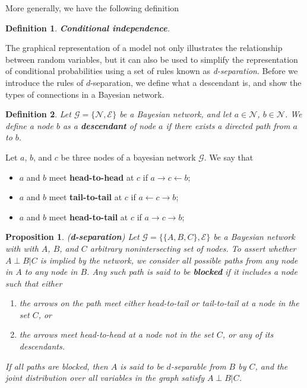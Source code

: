 \documentclass[12pt, oneside]{book}
\numberwithin{equation}{section}
\newtheorem{definition}{Definition}[section]
\newtheorem{proposition}{Proposition}[section]
\begin{document}
{More generally, we have the following definition
\begin{definition}
	\textbf{Conditional independence}.
\end{definition}

The graphical representation of a model not only illustrates the relationship between random variables, but it can also be used to simplify the representation of conditional probabilities using a set of rules known as \textit{d-separation}. Before we introduce the rules of $d$-separation, we define what a descendant is, and show the types of connections in a Bayesian network.

\begin{definition}
	Let $\mathcal G = \{\mathscr{N}, \mathscr{E}\}$ be a Bayesian network, and let $a \in \mathscr{N}$, $b \in \mathscr{N}$. We define a node $b$ as a \textbf{descendant} of node $a$ if there exists a directed path from $a$ to $b$.
\end{definition}

Let $a$, $b$, and $c$ be three nodes of a bayesian network $\mathcal G$. We say that
\begin{itemize}
	\item $a$ and $b$ meet \textbf{head-to-head} at $c$ if $a \rightarrow c \leftarrow b $;
	\item $a$ and $b$ meet \textbf{tail-to-tail} at $c$ if $a \leftarrow c \rightarrow b $;
	\item $a$ and $b$ meet \textbf{head-to-tail} at $c$ if $a \rightarrow c \rightarrow b $;
\end{itemize}

\begin{proposition}
	(\textbf{d-separation}) Let $\mathcal G = \{\{A, B, C\}, \mathscr{E}\}$ be a Bayesian network with with $A$, $B$, and $C$ arbitrary nonintersecting set of nodes. To assert whether $A \perp B \vert C$ is implied by the network, we consider all possible paths from any node in $A$ to any node in $B$. Any such path is said to be \textbf{blocked} if it includes a node such that either
	\begin{enumerate}
		\item the arrows on the path meet either head-to-tail or tail-to-tail at a node in the set $C$, or
		\item the arrows meet head-to-head at a node not in the set $C$, or any of its descendants.
	\end{enumerate}
	If all paths are blocked, then $A$ is said to be $d$-separable from $B$ by $C$, and the joint distribution over all variables in the graph satisfy $A \perp B \vert C$.
\end{proposition}

}
\end{document}
